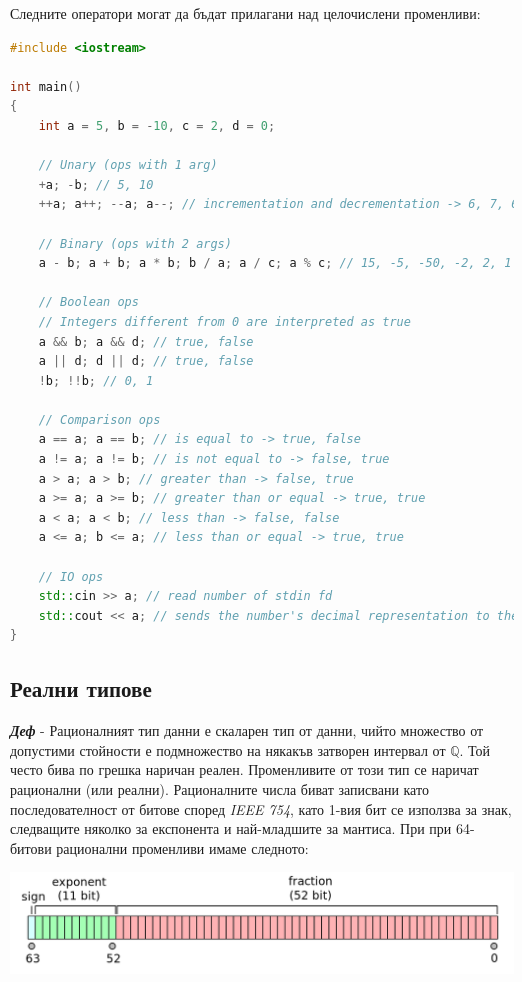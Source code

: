 \documentclass[fleqn,12pt]{article}
\begin{document}
\begin{flushleft}
Следните оператори могат да бъдат прилагани над целочислени променливи:

\begin{lstlisting}[language=C++, caption=Integer operators]
#include <iostream>

int main() 
{
    int a = 5, b = -10, c = 2, d = 0;

    // Unary (ops with 1 arg)
    +a; -b; // 5, 10
    ++a; a++; --a; a--; // incrementation and decrementation -> 6, 7, 6, 5

    // Binary (ops with 2 args)
    a - b; a + b; a * b; b / a; a / c; a % c; // 15, -5, -50, -2, 2, 1

    // Boolean ops
    // Integers different from 0 are interpreted as true
    a && b; a && d; // true, false
    a || d; d || d; // true, false
    !b; !!b; // 0, 1

    // Comparison ops
    a == a; a == b; // is equal to -> true, false
    a != a; a != b; // is not equal to -> false, true
    a > a; a > b; // greater than -> false, true
    a >= a; a >= b; // greater than or equal -> true, true
    a < a; a < b; // less than -> false, false
    a <= a; b <= a; // less than or equal -> true, true

    // IO ops
    std::cin >> a; // read number of stdin fd
    std::cout << a; // sends the number's decimal representation to the stdout fd
}
\end{lstlisting}

\subsection{Реални типове}

\textit{\textbf{Деф}} - Рационалният тип данни е скаларен тип от данни, чийто множество от допустими стойности е подмножество на някакъв затворен интервал от $\mathbb{Q}$.
Той често бива по грешка наричан реален. Променливите от този тип се наричат рационални (или реални).
Рационалните числа биват записвани като последователност от битове според \textit{IEEE 754}, като 1-вия бит се използва за знак, следващите няколко за експонента и най-младшите за мантиса.
При при 64-битови рационални променливи имаме следното:

\includegraphics[width=\textwidth]{floating_point_num.png}


\end{flushleft}
\end{document}
